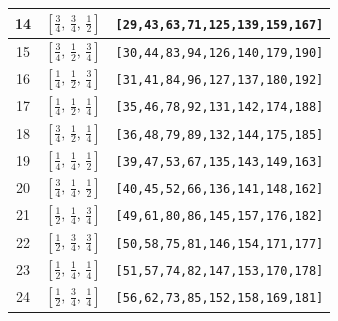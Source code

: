 \documentclass[fleqn,8pt]{jsarticle}
\begin{document}
\begin{longtable}{ccc}
14 & $\left[ \frac{3}{4},\, \frac{3}{4},\, \frac{1}{2} \right]$ & {\tt [29,43,63,71,125,139,159,167]} \\ \hline
15 & $\left[ \frac{3}{4},\, \frac{1}{2},\, \frac{3}{4} \right]$ & {\tt [30,44,83,94,126,140,179,190]} \\ \hline
16 & $\left[ \frac{1}{4},\, \frac{1}{2},\, \frac{3}{4} \right]$ & {\tt [31,41,84,96,127,137,180,192]} \\ \hline
17 & $\left[ \frac{1}{4},\, \frac{1}{2},\, \frac{1}{4} \right]$ & {\tt [35,46,78,92,131,142,174,188]} \\ \hline
18 & $\left[ \frac{3}{4},\, \frac{1}{2},\, \frac{1}{4} \right]$ & {\tt [36,48,79,89,132,144,175,185]} \\ \hline
19 & $\left[ \frac{1}{4},\, \frac{1}{4},\, \frac{1}{2} \right]$ & {\tt [39,47,53,67,135,143,149,163]} \\ \hline
20 & $\left[ \frac{3}{4},\, \frac{1}{4},\, \frac{1}{2} \right]$ & {\tt [40,45,52,66,136,141,148,162]} \\ \hline
21 & $\left[ \frac{1}{2},\, \frac{1}{4},\, \frac{3}{4} \right]$ & {\tt [49,61,80,86,145,157,176,182]} \\ \hline
22 & $\left[ \frac{1}{2},\, \frac{3}{4},\, \frac{3}{4} \right]$ & {\tt [50,58,75,81,146,154,171,177]} \\ \hline
23 & $\left[ \frac{1}{2},\, \frac{1}{4},\, \frac{1}{4} \right]$ & {\tt [51,57,74,82,147,153,170,178]} \\ \hline
24 & $\left[ \frac{1}{2},\, \frac{3}{4},\, \frac{1}{4} \right]$ & {\tt [56,62,73,85,152,158,169,181]} \\
\end{longtable}
\renewcommand{\arraystretch}{1.2}
\end{document}
